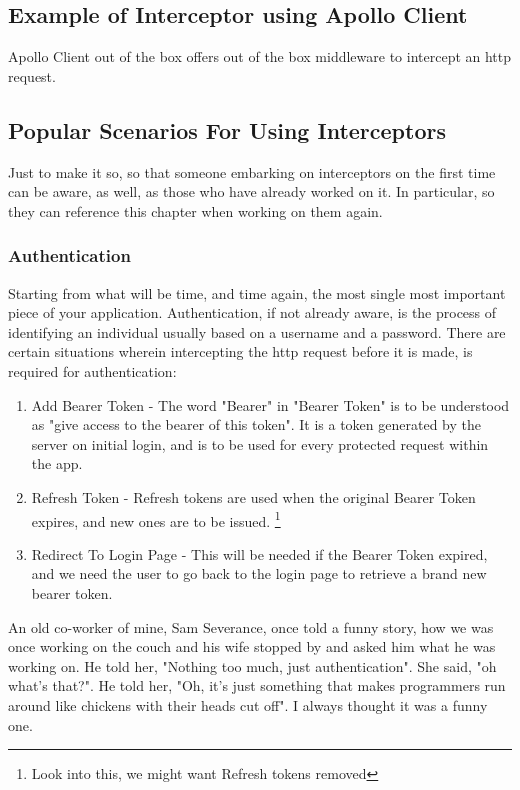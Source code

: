 \subsection{Example of Interceptor using Apollo Client}
Apollo Client out of the box offers out of the box middleware to intercept an
http request. 

\subsection{Popular Scenarios For Using Interceptors}
Just to make it so, so that someone embarking on interceptors on the first 
time can be aware, as well, as those who have already worked on it. In
particular, so they can reference this chapter when working on them again. 

\subsubsection{ Authentication }
Starting from what will be time, and time again, the most single most important
piece of your application. Authentication, if not already aware, is the process 
of identifying an individual usually based on a username and a password. There
are certain situations wherein intercepting the http request before it is made,
is required for authentication:
\begin{enumerate}
\item Add Bearer Token - The word "Bearer" in "Bearer Token" is to be 
understood as "give access to the bearer of this token". It is a token 
generated by the server on initial login, and is to be used for every protected
request within the app. 
\item Refresh Token - Refresh tokens are used when the original Bearer Token
expires, and new ones are to be issued.
\footnote{Look into this, we might want Refresh tokens removed} 
\item Redirect To Login Page - This will be needed if the Bearer Token expired,
and we need the user to go back to the login page to retrieve a brand new 
bearer token. 
\end{enumerate}

An old co-worker of mine, Sam Severance, once told a funny story, how we was
once working on the couch and his wife stopped by and asked him what he was 
working on. He told her, "Nothing too much, just authentication". She said, "oh
what's that?". He told her, "Oh, it's just something that makes programmers run
around like chickens with their heads cut off". I always thought it was a funny
one. 

